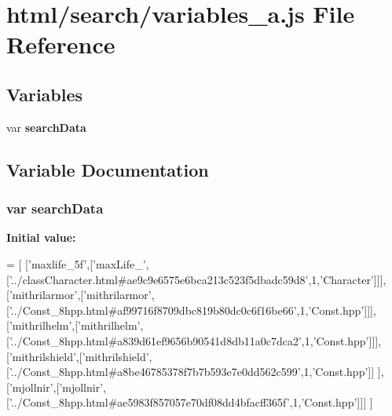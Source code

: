 \section{html/search/variables\-\_\-a.js File Reference}
\label{variables__a_8js}
\subsection*{Variables}
\begin{DoxyCompactItemize}
\item 
var {\bf search\-Data}
\end{DoxyCompactItemize}


\subsection{Variable Documentation}
\subsubsection[{search\-Data}]{\setlength{\rightskip}{0pt plus 5cm}var search\-Data}\label{variables__a_8js_ad01a7523f103d6242ef9b0451861231e}
{\bfseries Initial value\-:}
\begin{DoxyCode}
=
[
  [\textcolor{stringliteral}{'maxlife\_5f'},[\textcolor{stringliteral}{'maxLife\_'},[\textcolor{stringliteral}{'../classCharacter.html#ae9c9e6575e6bca213c523f5dbadc59d8'},1,\textcolor{stringliteral}{'Character'}]]],
  [\textcolor{stringliteral}{'mithrilarmor'},[\textcolor{stringliteral}{'mithrilarmor'},[\textcolor{stringliteral}{'../Const\_8hpp.html#af99716f8709dbc819b80dc0c6f16be66'},1,\textcolor{stringliteral}{'Const.hpp'}]]],
  [\textcolor{stringliteral}{'mithrilhelm'},[\textcolor{stringliteral}{'mithrilhelm'},[\textcolor{stringliteral}{'../Const\_8hpp.html#a839d61ef9656b90541d8db11a0c7dca2'},1,\textcolor{stringliteral}{'Const.hpp'}]]],
  [\textcolor{stringliteral}{'mithrilshield'},[\textcolor{stringliteral}{'mithrilshield'},[\textcolor{stringliteral}{'../Const\_8hpp.html#a8be46785378f7b7b593e7e0dd562c599'},1,\textcolor{stringliteral}{'Const.hpp'}]]
      ],
  [\textcolor{stringliteral}{'mjollnir'},[\textcolor{stringliteral}{'mjollnir'},[\textcolor{stringliteral}{'../Const\_8hpp.html#ae5983f857057e70df08dd4bfacff365f'},1,\textcolor{stringliteral}{'Const.hpp'}]]]
]
\end{DoxyCode}

